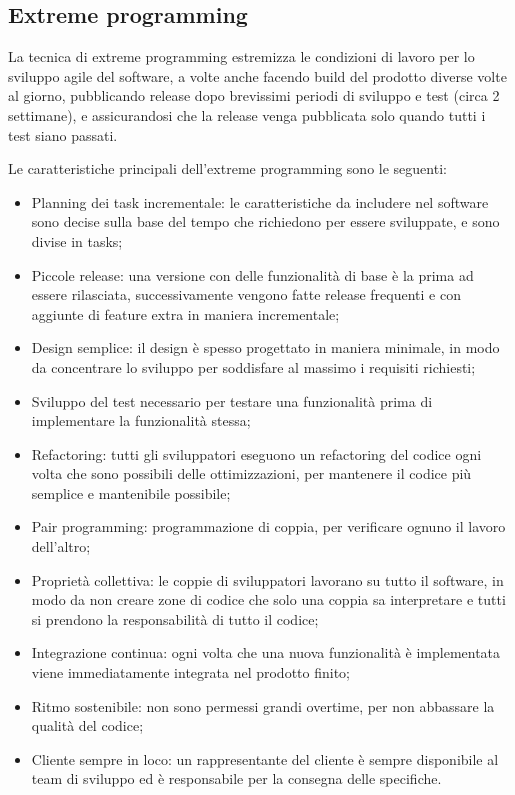 \documentclass[a4paper, 10pt]{article}
\begin{document}
		\subsection{Extreme programming}
		La tecnica di extreme programming estremizza le condizioni di lavoro per lo sviluppo agile del software, a volte anche facendo build del prodotto diverse volte al giorno, pubblicando release dopo brevissimi periodi di sviluppo e test (circa 2 settimane), e assicurandosi che la release venga pubblicata solo quando tutti i test siano passati.
		
		Le caratteristiche principali dell'extreme programming sono le seguenti:
		\begin{itemize}
			\item Planning dei task incrementale: le caratteristiche da includere nel software sono decise sulla base del tempo che richiedono per essere sviluppate, e sono divise in tasks;
			
			\item Piccole release: una versione con delle funzionalità di base è la prima ad essere rilasciata, successivamente vengono fatte release frequenti e con aggiunte di feature extra in maniera incrementale;
			
			\item Design semplice: il design è spesso progettato in maniera minimale, in modo da concentrare lo sviluppo per soddisfare al massimo i requisiti richiesti;
			
			\item Sviluppo del test necessario per testare una funzionalità prima di implementare la funzionalità stessa;
			
			\item Refactoring: tutti gli sviluppatori eseguono un refactoring del codice ogni volta che sono possibili delle ottimizzazioni, per mantenere il codice più semplice e mantenibile possibile;
			
			\item Pair programming: programmazione di coppia, per verificare ognuno il lavoro dell'altro;
			
			\item Proprietà collettiva: le coppie di sviluppatori lavorano su tutto il software, in modo da non creare zone di codice che solo una coppia sa interpretare e tutti si prendono la responsabilità di tutto il codice;
			
			\item Integrazione continua: ogni volta che una nuova funzionalità è implementata viene immediatamente integrata nel prodotto finito;
			
			\item Ritmo sostenibile: non sono permessi grandi overtime, per non abbassare la qualità del codice;
			
			\item Cliente sempre in loco: un rappresentante del cliente è sempre disponibile al team di sviluppo ed è responsabile per la consegna delle specifiche.
		\end{itemize}
		
\end{document}
